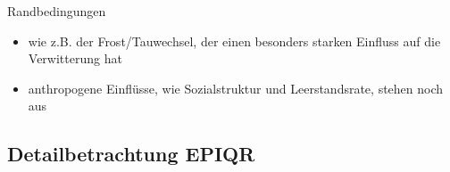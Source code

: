 \documentclass[fleqn,twoside,dvipsnames]{article}
\begin{document}
\begin{itemize}
\begin{itemize}
\begin{itemize}
                            \end{itemize}
                        Randbedingungen
                        \begin{itemize}
                            \item wie z.B. der Frost/Tauwechsel, der einen besonders starken Einfluss auf die Verwitterung hat
                            \item anthropogene Einflüsse, wie Sozialstruktur und Leerstandsrate, stehen noch aus
                        \end{itemize}
                    \end{itemize}
                \end{itemize}
    \subsection{Detailbetrachtung EPIQR} \label{EPIQR}
\end{document}
